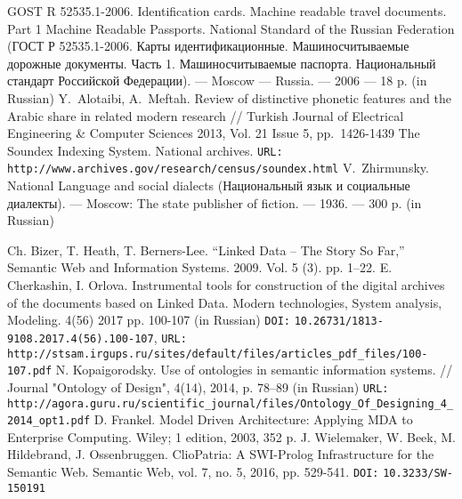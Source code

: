 \documentclass[conference,a4paper]{IEEEtran}
\providecommand\url[1]{\texttt{#1}}
\begin{document}
\begin{thebibliography}{11}
 GOST R 52535.1-2006. Identification cards. Machine readable travel documents. Part 1 Machine Readable Passports. National Standard of the Russian Federation (ГОСТ Р 52535.1-2006. Карты идентификационные. Машиносчитываемые дорожные документы. Часть 1. Машиносчитываемые паспорта. Национальный стандарт Российской Федерации). --- Moscow --- Russia. --- 2006 --- 18 p. (in Russian)
 Y.~Alotaibi, A.~Meftah. Review of distinctive phonetic features and the Arabic share in related modern research // Turkish Journal of Electrical Engineering \& Computer Sciences 2013, Vol. 21 Issue 5, pp.~1426-1439
	The Soundex Indexing System. National archives. \texttt{URL:} \url{http://www.archives.gov/research/census/soundex.html}
 V.~Zhirmunsky. National Language and social dialects (Национальный язык и социальные диалекты). --- Moscow: The state publisher of fiction. --- 1936. --- 300 p. (in Russian)





 Ch. Bizer, T. Heath, T. Berners-Lee. ``Linked Data – The Story So Far,'' Semantic Web and Information Systems. 2009. Vol. 5 (3). pp. 1–22.
 E. Cherkashin, I. Orlova. Instrumental tools for construction of the digital archives of the documents based on Linked Data. Modern technologies, System analysis, Modeling. 4(56) 2017 pp. 100-107 (in Russian) \texttt{DOI:} \url{10.26731/1813-9108.2017.4(56).100-107}, \texttt{URL:} \url{http://stsam.irgups.ru/sites/default/files/articles\_pdf\_files/100-107.pdf}
 N. Kopaigorodsky. Use of ontologies in semantic information systems. // Journal "Ontology of Design", 4(14), 2014, p. 78--89 (in Russian) \texttt{URL:} \url{http://agora.guru.ru/scientific\_journal/files/Ontology\_Of\_Designing\_4\_2014\_opt1.pdf}
 D. Frankel. Model Driven Architecture: Applying MDA to Enterprise Computing. Wiley; 1 edition, 2003, 352 p.
  J. Wielemaker, W. Beek, M. Hildebrand, J. Ossenbruggen. ClioPatria: A SWI-Prolog Infrastructure for the Semantic Web. Semantic Web, vol. 7, no. 5, 2016, pp. 529-541. \texttt{DOI:} \url{10.3233/SW-150191}


\end{thebibliography}
\end{document}

